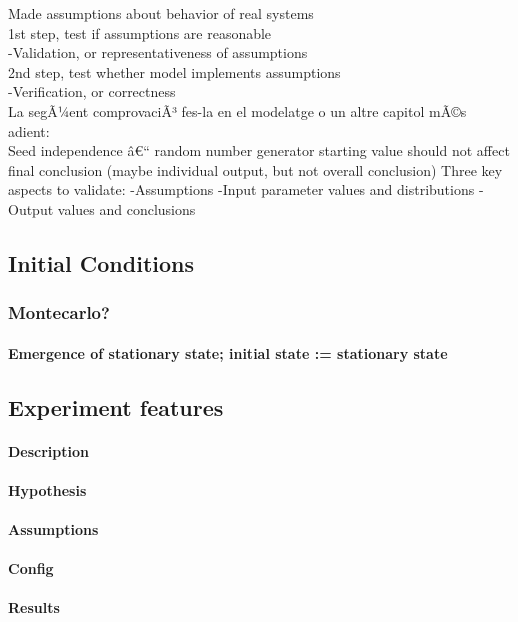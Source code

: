 \documentclass{report}
\begin{document}
Made assumptions about behavior of real systems\\
  1st step, test if assumptions are reasonable\\
    -Validation, or representativeness of assumptions\\
  2nd step, test whether model implements assumptions\\
    -Verification, or correctness\\

La segÃ¼ent comprovaciÃ³ fes-la en el modelatge o un altre capitol mÃ©s adient:\\
Seed independence â€“ random number generator starting value should not affect final conclusion (maybe individual output, but not overall conclusion)
Three key aspects to validate:
  -Assumptions
  -Input parameter values and distributions
  -Output values and conclusions





		\subsection{Initial Conditions}
			\subsubsection{Montecarlo?} 
			\paragraph{Emergence of stationary state; initial state := stationary state}
		\subsection{Experiment features}
			\paragraph{Description}
			\paragraph{Hypothesis}
			\paragraph{Assumptions}
			\paragraph{Config}
			\paragraph{Results}
\end{document}
